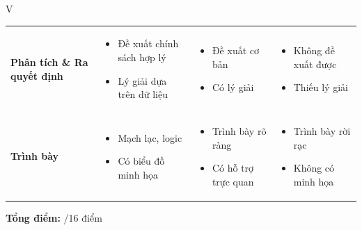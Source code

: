 \documentclass[12pt,a4paper]{article}
\begin{document}
\begin{competitionsection}{V}
\begin{tabularx}{\linewidth}{@{} >{\raggedright\arraybackslash}p{3cm} >{\raggedright\arraybackslash}X >{\raggedright\arraybackslash}X >{\raggedright\arraybackslash}X @{}}
    \textbf{Phân tích \& Ra quyết định} 
    & 
    \begin{itemize}[leftmargin=*,noitemsep,topsep=1ex]
        \item Đề xuất chính sách hợp lý
        \item Lý giải dựa trên dữ liệu
    \end{itemize}
    & 
    \begin{itemize}[leftmargin=*,noitemsep,topsep=1ex]
        \item Đề xuất cơ bản
        \item Có lý giải
    \end{itemize}
    & 
    \begin{itemize}[leftmargin=*,noitemsep,topsep=1ex]
        \item Không đề xuất được
        \item Thiếu lý giải
    \end{itemize} \\
    \addlinespace
    
    \textbf{Trình bày} 
    & 
    \begin{itemize}[leftmargin=*,noitemsep,topsep=1ex]
        \item Mạch lạc, logic
        \item Có biểu đồ minh họa
    \end{itemize}
    & 
    \begin{itemize}[leftmargin=*,noitemsep,topsep=1ex]
        \item Trình bày rõ ràng
        \item Có hỗ trợ trực quan
    \end{itemize}
    & 
    \begin{itemize}[leftmargin=*,noitemsep,topsep=1ex]
        \item Trình bày rời rạc
        \item Không có minh họa
    \end{itemize} \\
    \bottomrule
\end{tabularx}
\vspace{1em}
\noindent\textbf{Tổng điểm:} \underline{\hspace{2cm}}/16 điểm

\newpage

\end{competitionsection}
\end{document}
